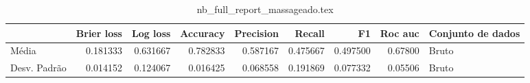 \begin{table}
\centering
\caption{nb_full_report_massageado.tex}
\label{nb_full_report_massageado.tex}
\begin{tabular}{lrrrrrrrl}
\toprule
{} &  Brier  loss &  Log loss &  Accuracy  &  Precision  &   Recall  &       F1  &  Roc auc  & Conjunto de dados \\
\midrule
Média        &     0.181333 &  0.631667 &   0.782833 &    0.587167 &  0.475667 &  0.497500 &   0.67800 &             Bruto \\
Desv. Padrão &     0.014152 &  0.124067 &   0.016425 &    0.068558 &  0.191869 &  0.077332 &   0.05506 &             Bruto \\
\bottomrule
\end{tabular}
\end{table}
